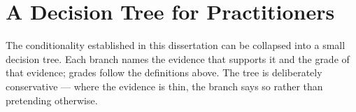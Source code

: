 %
%

\section{A Decision Tree for Practitioners}
\label{sec:decision_tree}

The conditionality established in this dissertation can be collapsed into a
small decision tree. Each branch names the evidence that supports it and the
grade of that evidence; grades follow the definitions above. The tree is
deliberately conservative --- where the evidence is thin, the branch says so
rather than pretending otherwise.

